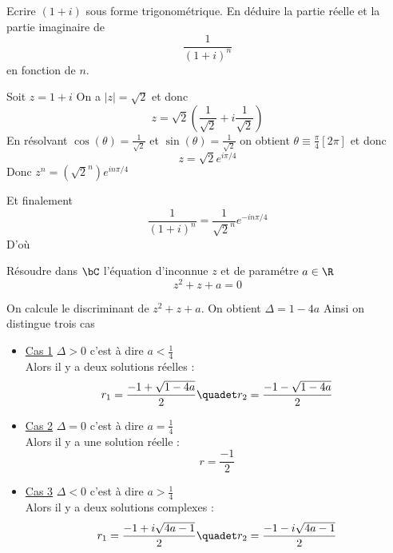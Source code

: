 \documentclass[a4paper, 11pt,reqno]{article}
\begin{document}
\begin{exercice}
Ecrire $(1+i)$ sous forme trigonométrique.
En déduire la partie réelle et la partie imaginaire de 
$$\frac{1}{(1+i)^n}$$
 en fonction de $n$.
\end{exercice}
\begin{correction}
Soit $z=1+i$ On a $|z|=\sqrt{2}$ et donc 
$$z=\sqrt{2}(\frac{1}{\sqrt{2}} +i \frac{1}{\sqrt{2}})$$
En résolvant $\cos(\theta)= \frac{1}{\sqrt{2}} $ et $\sin(\theta)=\frac{1}{\sqrt{2}}$ on obtient $\theta \equiv \frac{\pi}{4}[2\pi]$
et  donc 
$$z= \sqrt{2} e^{i\pi/4}$$
Donc $z^n= (\sqrt{2}^n)e^{in\pi/4}$

Et finalement 
$$\frac{1}{(1+i)^n}= \frac{1}{\sqrt{2}^n} e^{-in\pi/4}$$
D'où


\end{correction}

\begin{exercice}
Résoudre dans $\bC$ l'équation d'inconnue $z$ et de paramétre $a\in \R$  
$$z^2+z+a=0$$

\end{exercice}

\begin{correction}
On calcule le discriminant de $z^2+z+a$. On obtient 
$\Delta =1-4a$
Ainsi on distingue trois cas 
\begin{itemize}
\item \underline{Cas 1} $\Delta >0 $ c'est à dire $a< \frac{1}{4}$\\
Alors il y a deux solutions réelles : 
$$r_1 = \frac{-1 +\sqrt{1-4a}}{2} \quadet r_2 = \frac{-1 -\sqrt{1-4a}}{2}  $$


\item \underline{Cas 2} $\Delta =0 $ c'est à dire $a=\frac{1}{4}$\\
Alors il y a une solution réelle : 
$$r = \frac{-1}{2}  $$


\item \underline{Cas 3} $\Delta <0 $ c'est à dire $a> \frac{1}{4}$\\
Alors il y a deux solutions complexes : 
$$r_1 = \frac{-1 +i\sqrt{4a-1}}{2} \quadet r_2 = \frac{-1 -i\sqrt{4a-1}}{2}  $$



\end{itemize}

\end{correction}
\end{document}
